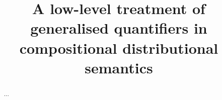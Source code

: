 \documentclass[a4paper,11pt]{llncs}
\title{A low-level treatment of generalised quantifiers in  compositional distributional semantics}
\author{}
\institute{
\email{}}
\begin{document}
\maketitle
\begin{abstract}...
\end{abstract}










%














\end{document}
